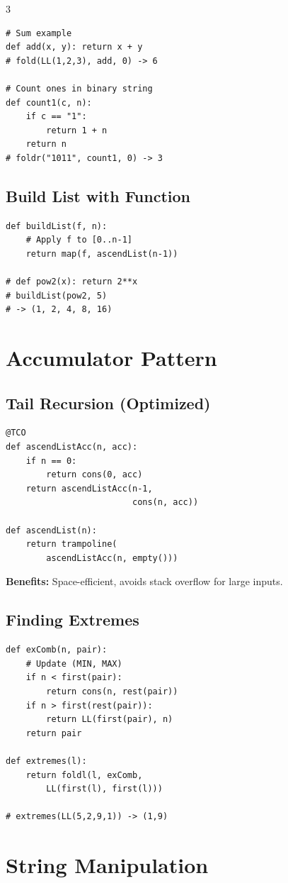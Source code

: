 \documentclass[8pt,landscape,a4paper]{article}
\begin{document}
\begin{multicols}{3}
\begin{lstlisting}
# Sum example
def add(x, y): return x + y
# fold(LL(1,2,3), add, 0) -> 6

# Count ones in binary string
def count1(c, n):
    if c == "1":
        return 1 + n
    return n
# foldr("1011", count1, 0) -> 3
\end{lstlisting}

\subsection*{Build List with Function}
\begin{lstlisting}
def buildList(f, n):
    # Apply f to [0..n-1]
    return map(f, ascendList(n-1))

# def pow2(x): return 2**x
# buildList(pow2, 5)
# -> (1, 2, 4, 8, 16)
\end{lstlisting}

\section*{Accumulator Pattern}

\subsection*{Tail Recursion (Optimized)}
\begin{lstlisting}
@TCO
def ascendListAcc(n, acc):
    if n == 0:
        return cons(0, acc)
    return ascendListAcc(n-1, 
                         cons(n, acc))

def ascendList(n):
    return trampoline(
        ascendListAcc(n, empty()))
\end{lstlisting}

\textbf{Benefits:} Space-efficient, avoids stack overflow for large inputs.

\subsection*{Finding Extremes}
\begin{lstlisting}
def exComb(n, pair):
    # Update (MIN, MAX)
    if n < first(pair):
        return cons(n, rest(pair))
    if n > first(rest(pair)):
        return LL(first(pair), n)
    return pair

def extremes(l):
    return foldl(l, exComb, 
        LL(first(l), first(l)))

# extremes(LL(5,2,9,1)) -> (1,9)
\end{lstlisting}

\section*{String Manipulation}


\end{multicols}
\end{document}
